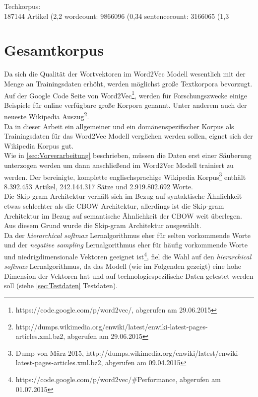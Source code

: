 \documentclass[12pt,a4paper]{report}
\begin{document}
	
	Techkorpus:\\
	187144 Artikel (2,2%
	wordcount: 9866096 (0,34%
	sentencecount: 3166065 (1,3%
\fi
	\section{Gesamtkorpus}
	\label{sec:Gesamtkorpus}
	Da sich die Qualität  der Wortvektoren im Word2Vec Modell wesentlich mit der Menge an Trainingsdaten erhöht\citep{DBLP:journals/corr/abs-1301-3781}, werden möglichst große Textkorpora bevorzugt. Auf der Google Code Seite von Word2Vec\footnote{https://code.google.com/p/word2vec/, abgerufen am 29.06.2015}, werden für Forschungszwecke einige Beispiele für online verfügbare große Korpora genannt. Unter anderem auch der neueste Wikipedia Auszug\footnote{http://dumps.wikimedia.org/enwiki/latest/enwiki-latest-pages-articles.xml.bz2, abgerufen am 29.06.2015}.\\
	Da in dieser Arbeit ein allgemeiner und ein domänenspezifischer Korpus als Trainingsdaten für das Word2Vec Modell verglichen werden sollen, eignet sich der Wikipedia Korpus gut. \\
	Wie in \ref{sec:Vorverarbeitung} beschrieben, müssen die Daten erst einer Säuberung unterzogen werden um dann anschließend im Word2Vec Modell trainiert zu werden. Der bereinigte, komplette englischsprachige Wikipedia Korpus\footnote{Dump von März 2015, http://dumps.wikimedia.org/enwiki/latest/enwiki-latest-pages-articles.xml.bz2, abgerufen am 09.04.2015} enthält 8.392.453 Artikel, 242.144.317 Sätze und 2.919.802.692 Worte.\\


Die Skip-gram Architektur verhält sich im Bezug auf syntaktische Ähnlichkeit etwas schlechter als die CBOW Architektur, allerdings ist die Skip-gram Architektur im Bezug auf semantische Ähnlichkeit der CBOW weit überlegen\citep{DBLP:journals/corr/abs-1301-3781}.\\ Aus diesem Grund wurde die Skip-gram Architektur ausgewählt.\\
Da der \textit{hierarchical softmax} Lernalgorithmus eher für selten vorkommende Worte und der \textit{negative sampling} Lernalgorithmus eher für häufig vorkommende Worte und niedrigdimensionale Vektoren geeignet ist\footnote{https://code.google.com/p/word2vec/\#Performance, abgerufen am 01.07.2015}, fiel die Wahl auf den \textit{hierarchical softmax} Lernalgorithmus, da das Modell (wie im Folgenden gezeigt) eine hohe Dimension der Vektoren hat und auf technologiespezifische Daten getestet werden soll (siehe \ref{sec:Testdaten} Testdaten).\\
\end{document}
